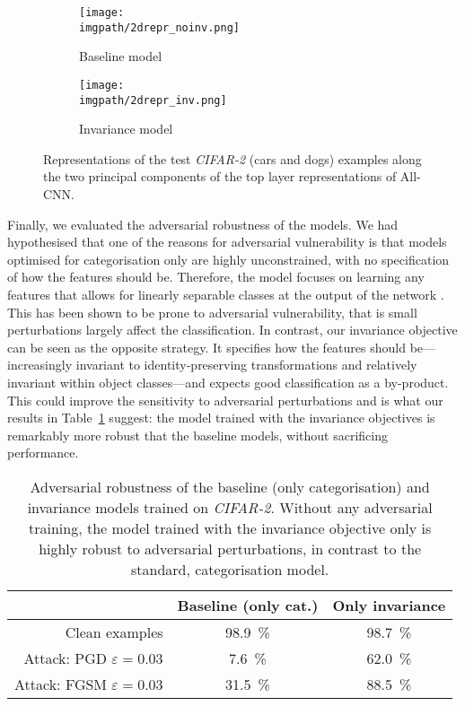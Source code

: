 {\begin{figure}[ht]
  \centering
  \begin{subfigure}{0.4 \linewidth}
      \texttt{[image: \\imgpath/2drepr\_noinv.png]}
      \caption{Baseline model}
  \end{subfigure}
  \begin{subfigure}{0.4 \linewidth}
      \texttt{[image: \\imgpath/2drepr\_inv.png]}
      \caption{Invariance model}
  \end{subfigure}
  \caption{Representations of the test \textit{CIFAR-2} (cars and dogs) examples along the two principal components of the top layer representations of All-CNN.}
  \label{fig:invariance-2d_representations}
\end{figure}

Finally, we evaluated the adversarial robustness of the models. We had hypothesised that one of the reasons for adversarial vulnerability is that models optimised for categorisation only are highly unconstrained, with no specification of how the features should be. Therefore, the model focuses on learning any features that allows for linearly separable classes at the output of the network \citep{malhotra2020bioconstraints}. This has been shown to be prone to adversarial vulnerability, that is small perturbations largely affect the classification. In contrast, our invariance objective can be seen as the opposite strategy. It specifies how the features should be---increasingly invariant to identity-preserving transformations and relatively invariant within object classes---and expects good classification as a by-product. This could improve the sensitivity to adversarial perturbations and is what our results in Table~\ref{tab:invariance-adversarial_robustness} suggest: the model trained with the invariance objectives is remarkably more robust that the baseline models, without sacrificing performance.

\begin{table}[htb]
    \begin{center}
    \begin{tabular}{rcc}
                & Baseline (only cat.)  & Only invariance \\
        \hline
        Clean examples                 & 98.9~\% & 98.7~\%\\
        Attack: PGD $\varepsilon=0.03$  & 7.6~\%  & 62.0~\%\\
        Attack: FGSM $\varepsilon=0.03$ & 31.5~\% & 88.5~\%\\
    \end{tabular}
    \end{center}
    \caption{Adversarial robustness of the baseline (only categorisation) and invariance models trained on \textit{CIFAR-2}. Without any adversarial training, the model trained with the invariance objective only is highly robust to adversarial perturbations, in contrast to the standard, categorisation model.}
\label{tab:invariance-adversarial_robustness}
\end{table}

}
